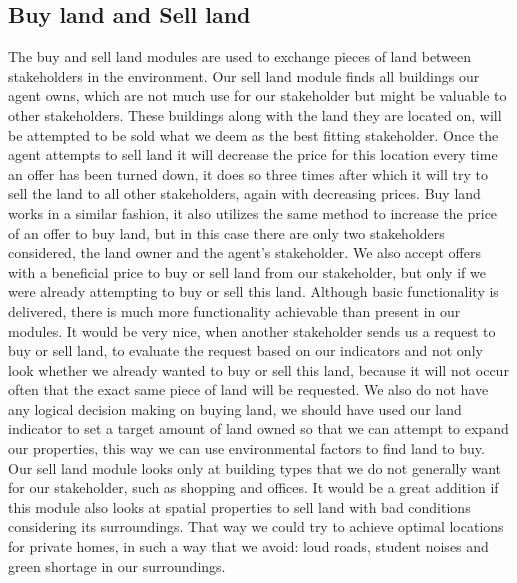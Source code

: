 \subsection{Buy land and Sell land}
The buy and sell land modules are used to exchange pieces of land between stakeholders in the environment. Our sell land module finds all buildings our agent owns, which are not much use for our stakeholder but might be valuable to other stakeholders. These buildings along with the land they are located on, will be attempted to be sold what we deem as the best fitting stakeholder. Once the agent attempts to sell land it will decrease the price for this location every time an offer has been turned down, it does so three times after which it will try to sell the land to all other stakeholders, again with decreasing prices. Buy land works in a similar fashion, it also utilizes the same method to increase the price of an offer to buy land, but in this case there are only two stakeholders considered, the land owner and the agent's stakeholder. We also accept offers with a beneficial price to buy or sell land from our stakeholder, but only if we were already attempting to buy or sell this land. 
Although basic functionality is delivered, there is much more functionality achievable than present in our modules. It would be very nice, when another stakeholder sends us a request to buy or sell land, to evaluate the request based on our indicators and not only look whether we already wanted to buy or sell this land, because it will not occur often that the exact same piece of land will be requested. We also do not have any logical decision making on buying land, we should have used our land indicator to set a target amount of land owned so that we can attempt to expand our properties, this way we can use environmental factors to find land to buy. Our sell land module looks only at building types that we do not generally want for our stakeholder, such as shopping and offices. It would be a great addition if this module also looks at spatial properties to sell land with bad conditions considering its surroundings. That way we could try to achieve optimal locations for private homes, in such a way that we avoid: loud roads, student noises and green shortage in our surroundings. 

